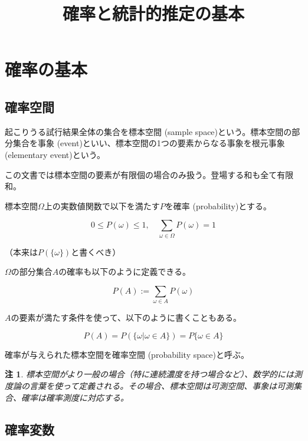 \documentclass[uplatex,dvipdfmx]{jlreq}
\newcommand\term[1]{\textsf{#1}}
\newtheorem{note}{注}
\begin{document}
\title{確率と統計的推定の基本}
\maketitle

\section{確率の基本}

\subsection{確率空間}

起こりうる試行結果全体の集合を\term{標本空間 (sample space)}という。標本空間の部分集合を\term{事象 (event)}といい、標本空間の1つの要素からなる事象を\term{根元事象 (elementary event)}という。

この文書では標本空間の要素が有限個の場合のみ扱う。登場する和も全て有限和。

標本空間$\Omega$上の実数値関数で以下を満たす$P$を\term{確率 (probability)}とする。

\begin{equation}
    0 \leq P(\omega) \leq 1,
    \quad \sum_{\omega\in\Omega} P(\omega) = 1
\end{equation}

（本来は$P(\{\omega\})$と書くべき）

$\Omega$の部分集合$A$の確率も以下のように定義できる。

\begin{equation}
    P(A) := \sum_{\omega\in A}P(\omega)
\end{equation}

$A$の要素が満たす条件を使って、以下のように書くこともある。

\begin{equation}
    P(A) = P(\{\omega|\omega\in A\}) = P\{\omega\in A\}
\end{equation}

確率が与えられた標本空間を\term{確率空間 (probability space)}と呼ぶ。

\begin{note}
    標本空間がより一般の場合（特に連続濃度を持つ場合など）、数学的には測度論の言葉を使って定義される。その場合、標本空間は可測空間、事象は可測集合、確率は確率測度に対応する。
\end{note}

\subsection{確率変数}
\end{document}
